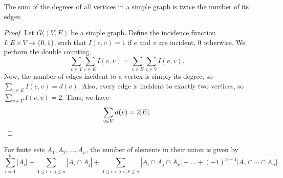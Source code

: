\documentclass[11pt]{article}
\theoremstyle{definition}
\theoremstyle{remark}
\numberwithin{equation}{section}
\begin{document}
    \begin{theorem}
        The sum of the degrees of all vertices in a simple graph is twice the number
        of its edges. 
    \end{theorem}
    \begin{proof}
        Let $G((V, E)$ be a simple graph. 
        Define the incidence function $I\colon E \times V \to \{0, 1\}$, such that
        $I(e, v) = 1$ if $e$ and $v$ are incident, $0$ otherwise. We perform the
        double counting, \[
            \sum_{v\in V}\sum_{e \in E} I(e, v) = \sum_{e \in E}\sum_{v \in V} I(e,
            v).
        \] Now, the number of edges incident to a vertex is simply its degree, so
        $\sum_{e \in E} I(e, v) = d(v)$. Also, every edge is incident to exactly two
        vertices, so $\sum_{v \in V} I(e, v) = 2$. Thus, we have \[
            \sum_{v \in V} d(v) = 2 |E|. \qedhere
        \] 
    \end{proof}

    \begin{lemma}
        For finite sets $A_1, A_2, \dots, A_n$, the number of elements in their union
        is given by \[
            \sum_{i=1}^n |A_i| - \sum_{1 \leq i < j \leq n} |A_i\cap A_j| +
            \sum_{1 \leq i < j < k \leq n} |A_i \cap A_j\cap A_k| - \dots + 
            (-1)^{n-1} \left|A_1\cap\cdots\cap A_n\right|.
        \] 
    \end{lemma}
\end{document}
